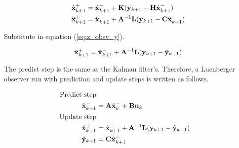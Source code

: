 \begin{align*}
  \hat{\mathbf{x}}_{k+1}^+ &= \hat{\mathbf{x}}_{k+1}^- + \mathbf{K}(\mathbf{y}_{k+1} -
    \mathbf{H}\hat{\mathbf{x}}_{k+1}^-) \\
  \hat{\mathbf{x}}_{k+1}^+ &= \hat{\mathbf{x}}_{k+1}^- + \mathbf{A}^{-1}\mathbf{L}
    (\mathbf{y}_{k+1} - \mathbf{C}\hat{\mathbf{x}}_{k+1}^-)
\end{align*}

Substitute in equation (\ref{eq:z_obsv_y}).

\begin{equation*}
  \hat{\mathbf{x}}_{k+1}^+ = \hat{\mathbf{x}}_{k+1}^- + \mathbf{A}^{-1}\mathbf{L}
    (\mathbf{y}_{k+1} - \hat{\mathbf{y}}_{k+1})
\end{equation*}

The predict step is the same as the Kalman filter's. Therefore, a Luenberger
observer run with prediction and update steps is written as follows.

\begin{align}
  \text{Predict step} \nonumber \\
  \hat{\mathbf{x}}_{k+1}^- &= \mathbf{A}\hat{\mathbf{x}}_k^- + \mathbf{B}\mathbf{u}_k \\
  \text{Update step} \nonumber \\
  \hat{\mathbf{x}}_{k+1}^+ &= \hat{\mathbf{x}}_{k+1}^- + \mathbf{A}^{-1}\mathbf{L}
    (\mathbf{y}_{k+1} - \hat{\mathbf{y}}_{k+1}) \\
  \hat{\mathbf{y}}_{k+1} &= \mathbf{C} \hat{\mathbf{x}}_{k+1}^-
\end{align}

